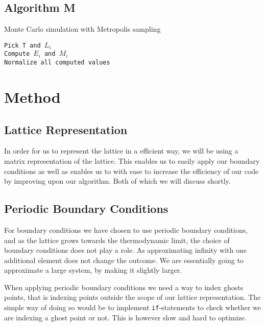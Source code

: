 \documentclass[%
reprint,
nofootinbib,
amsmath,amssymb,
aps,
]{revtex4-1}
\begin{document}
\subsection{Algorithm M}
\begin{algorithm}[H]\label{algo:metropolis}
	\SetAlgoLined
	\caption{Monte Carlo simulation with Metropolis sampling}
	\texttt{Pick T and $L_i$}	\\
	\texttt{Compute $E_i$ and $M_i$}\\
	\texttt{Normalize all computed values}
\end{algorithm}
\section{Method}
\subsection{Lattice Representation} %
In order for us to represent the lattice in a efficient way, we will be using a matrix representation of the lattice. This enables us to easily apply our boundary conditions as well as enables us to with ease to increase the efficiency of our code by improving upon our algorithm. Both of which we will discuss shortly. 
\subsection{Periodic Boundary Conditions} %
For boundary conditions we have chosen to use periodic boundary conditions, and as the lattice grows towards the thermodynamic limit, the choice of boundary conditions does not play a role. As approximating infinity with one additional element does not change the outcome. We are essentially going to approximate a large system, by making it slightly larger. 

When applying periodic boundary conditions we need a way to index ghosts points, that is indexing points outside the scope of our lattice representation. The simple way of doing so would be to implement \texttt{if}-statements to check whether we are indexing a ghost point or not. This is however slow and hard to optimize. 
\end{document}
